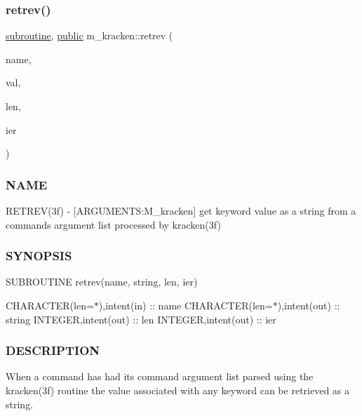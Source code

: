 \subsubsection{\texorpdfstring{retrev()}{retrev()}}
{\footnotesize\ttfamily \hyperlink{M__stopwatch_83_8txt_acfbcff50169d691ff02d4a123ed70482}{subroutine}, \hyperlink{M__stopwatch_83_8txt_a2f74811300c361e53b430611a7d1769f}{public} m\+\_\+kracken\+::retrev (\begin{DoxyParamCaption}\item[{\hyperlink{option__stopwatch_83_8txt_abd4b21fbbd175834027b5224bfe97e66}{character}(len=$\ast$), intent(\hyperlink{M__journal_83_8txt_afce72651d1eed785a2132bee863b2f38}{in})}]{name,  }\item[{\hyperlink{option__stopwatch_83_8txt_abd4b21fbbd175834027b5224bfe97e66}{character}(len=$\ast$), intent(out)}]{val,  }\item[{integer, intent(out)}]{len,  }\item[{integer, intent(out)}]{ier }\end{DoxyParamCaption})}



\subsubsection*{N\+A\+ME}

R\+E\+T\+R\+E\+V(3f) -\/ \mbox{[}A\+R\+G\+U\+M\+E\+N\+TS\+:M\+\_\+kracken\mbox{]} get keyword value as a string from a command\textquotesingle{}s argument list processed by kracken(3f) 

\subsubsection*{S\+Y\+N\+O\+P\+S\+IS}

S\+U\+B\+R\+O\+U\+T\+I\+NE retrev(name, string, len, ier)

C\+H\+A\+R\+A\+C\+T\+ER(len=$\ast$),intent(in) \+:\+: name C\+H\+A\+R\+A\+C\+T\+ER(len=$\ast$),intent(out) \+:\+: string I\+N\+T\+E\+G\+ER,intent(out) \+:\+: len I\+N\+T\+E\+G\+ER,intent(out) \+:\+: ier

\subsubsection*{D\+E\+S\+C\+R\+I\+P\+T\+I\+ON}

When a command has had it\textquotesingle{}s command argument list parsed using the kracken(3f) routine the value associated with any keyword can be retrieved as a string.

